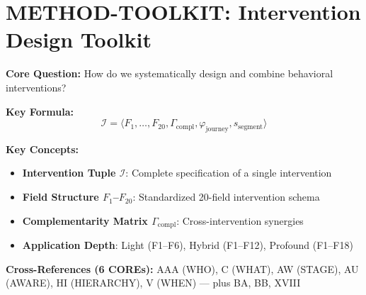 
\chapter{METHOD-TOOLKIT: Intervention Design Toolkit}
\label{app:hhh-toolkit}


\begin{abstract}
How should interventions be systematically designed, combined, and evaluated within the EBF framework? This appendix provides a structured toolkit with 20 standardized fields for intervention specification, enabling BCM-compatible intervention architecture. It operationalizes complementarities between measures, integrates journey phases, and supports segment-specific targeting across all context levels from individual to societal.
\end{abstract}


\begin{tcolorbox}[colback=blue!5!white, colframe=blue!75!black,
    title=Quick Reference: Intervention Design Toolkit]

\textbf{Core Question:} How do we systematically design and combine behavioral interventions?

\textbf{Key Formula:}
\begin{equation}
\mathcal{I} = \langle F_1, \ldots, F_{20}, \Gamma_{\text{compl}}, \varphi_{\text{journey}}, s_{\text{segment}} \rangle
\label{eq:hhh-intervention-tuple}
\end{equation}

\textbf{Key Concepts:}
\begin{itemize}[nosep]
\item \textbf{Intervention Tuple $\mathcal{I}$}: Complete specification of a single intervention
\item \textbf{Field Structure $F_1$--$F_{20}$}: Standardized 20-field intervention schema
\item \textbf{Complementarity Matrix $\Gamma_{\text{compl}}$}: Cross-intervention synergies
\item \textbf{Application Depth}: Light (F1--F6), Hybrid (F1--F12), Profound (F1--F18)
\end{itemize}

\textbf{Cross-References (6 COREs):} AAA (WHO), C (WHAT), AW (STAGE), AU (AWARE), HI (HIERARCHY), V (WHEN) --- plus BA, BB, XVIII
\end{tcolorbox}

